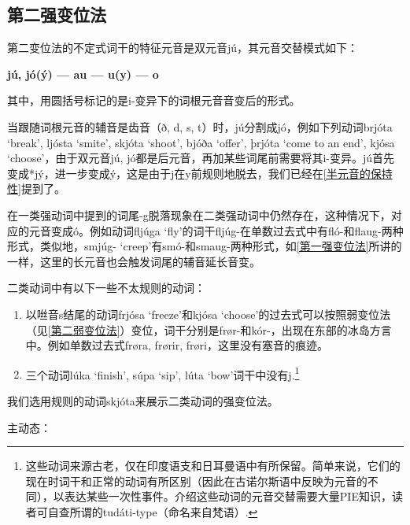 \subsection{第二强变位法}\label{第二强变位法}

第二变位法的不定式词干的特征元音是双元音jú，其元音交替模式如下：
\begin{center}
    \textbf{jú, jó(ý) --- au --- u(y) --- o}
\end{center}


其中，用圆括号标记的是i-变异下的词根元音音变后的形式。

当跟随词根元音的辅音是齿音（ð, d, s, t）时，jú分割成jó，例如下列动词brjóta `break‌', ljósta `smite‌', skjóta `shoot‌', bjóða `offer‌', þrjóta `come to an end‌', kjósa `choose‌'，由于双元音jú, jó都是后元音，再加某些词尾前需要将其i-变异。jú首先变成*jý，进一步变成ý，这是由于j在y前规则地脱去，我们已经在\ref{半元音的保持性}提到了。

在一类强动词中提到的词尾-g脱落现象在二类强动词中仍然存在，这种情况下，对应的元音变成ó。例如动词fljúga
`fly‌'的词干fljúg-在单数过去式中有fló-和flaug-两种形式，类似地，smjúg- `creep‌'有smó-和smaug-两种形式，如\ref{第一强变位法}所讲的一样，这里的长元音也会触发词尾的辅音延长音变。

二类动词中有以下一些不太规则的动词：

\begin{enumerate}
    \item
          以咝音s结尾的动词frjósa `freeze‌'和kjósa `choose‌'的过去式可以按照弱变位法（见\ref{第二弱变位法}）变位，词干分别是frør-和kór-，出现在东部的冰岛方言中。例如单数过去式frøra, frørir, frøri，这里没有塞音的痕迹。
    \item
          三个动词lúka `finish‌', súpa `sip‌', lúta `bow‌'词干中没有j.\footnote{这些动词来源古老，仅在印度语支和日耳曼语中有所保留。简单来说，它们的现在时词干和正常的动词有所区别（因此在古诺尔斯语中反映为元音的不同），以表达某些一次性事件。介绍这些动词的元音交替需要大量PIE知识，读者可自查所谓的tudáti-type（命名来自梵语）.}
\end{enumerate}

我们选用规则的动词skjóta来展示二类动词的强变位法。

主动态：

